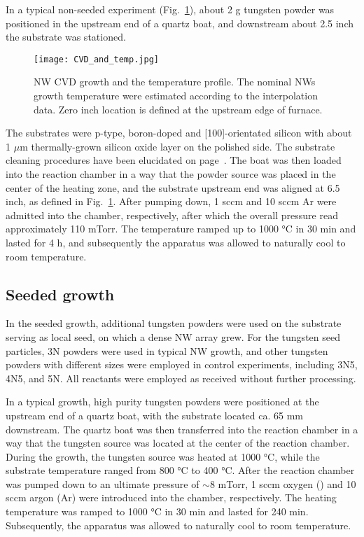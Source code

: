 In a typical non-seeded experiment (Fig.~\ref{fig:wogrow}), about 2 g tungsten powder was positioned in the upstream end of a quartz boat, and downstream about 2.5 inch the substrate was stationed. 
\begin{figure}[htb]
\centering
\texttt{[image: CVD\_and\_temp.jpg]}
\caption[ NW CVD growth]{ NW CVD growth and the temperature profile. The nominal NWs growth temperature were estimated according to the interpolation data. Zero inch location is defined at the upstream edge of furnace.}
\label{fig:wogrow}
\end{figure}
The substrates were p-type, boron-doped and [100]-orientated silicon with about 1 $\mu$m thermally-grown silicon oxide layer on the polished side. The substrate cleaning procedures have been elucidated on page~\pageref{ch2sub}. The boat was then loaded into the reaction chamber in a way that the powder source was placed in the center of the heating zone, and the substrate upstream end was aligned at 6.5 inch, as defined in Fig.~\ref{fig:wogrow}. After pumping down, 1 \gls{sccm}  and 10 sccm Ar were admitted into the chamber, respectively, after which the overall pressure read approximately 110 mTorr. The temperature ramped up to 1000 \si{\degreeCelsius} in 30 min and lasted for 4 h, and subsequently the apparatus was allowed to naturally cool to room temperature.

\subsection{Seeded growth}
In the seeded growth, additional tungsten powders were used on the substrate serving as local seed, on which a dense  NW array grew. For the tungsten seed particles, 3N powders were used in typical NW growth, and other tungsten powders with different sizes were employed in control experiments, including 3N5, 4N5, and 5N. All reactants were employed as received without further processing.
 
In a typical growth, high purity tungsten powders were positioned at the upstream end of a quartz boat, with the substrate located ca. 65 mm downstream. The quartz boat was then transferred into the reaction chamber in a way that the tungsten source was located at the center of the reaction chamber. During the growth, the tungsten source was heated at 1000 \si{\degreeCelsius}, while the substrate temperature ranged from 800 \si{\degreeCelsius} to 400 \si{\degreeCelsius}. After the reaction chamber was pumped down to an ultimate pressure of $\sim8$ mTorr, 1 sccm oxygen () and 10 sccm argon (Ar) were introduced into the chamber, respectively. The heating temperature was ramped to 1000 \si{\degreeCelsius} in 30 min and lasted for 240 min. Subsequently, the apparatus was allowed to naturally cool to room temperature. 

